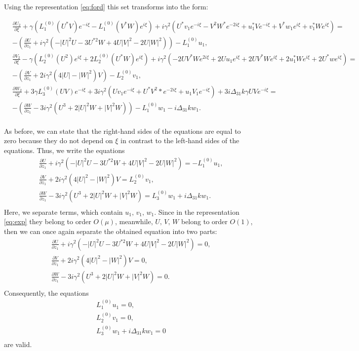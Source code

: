 \documentclass[a4paper, 12pt, onecolumn]{extarticle}
\begin{document}
Using the representation \eqref{eq:ford} this set transforms into the form:
\begin{small}
\[\begin{aligned}
&\frac{\partial U_2}{\partial \xi}+\gamma(L_1^{(0)}(U^*V)e^{-i\xi}-L_1^{(0)}(V^*W)e^{i\xi})+i\gamma^2(U^*v_1e^{-i\xi}-V^2W^*e^{-2i\xi}+u_1^*Ve^{-i\xi}+V^*w_1e^{i\xi}+v_1^*We^{i\xi})=\\
&-\left(\frac{\partial U}{\partial z_1}+i\gamma^2(-|U|^2U-3U^{*2}W+4U|V|^2-2U|W|^2)\right)-L_1^{(0)}u_1,\\
&\frac{\partial V_2}{\partial \xi}-\gamma(L_2^{(0)}(U^2)e^{i\xi}+2L_2^{(0)}(U^*W)e^{i\xi})+i\gamma^2(-2UV^*We^{2i\xi}+2Uu_1e^{i\xi}+2UV^*We^{i\xi}+2u_1^*We^{i\xi}+2U^*we^{i\xi})=\\
&-\left(\frac{\partial V}{\partial z_1}+2i\gamma^2(4|U|-|W|^2)V\right)-L_2^{(0)}v_1,\\
&\frac{\partial W_2}{\partial \xi}+3\gamma L_3^{(0)}(UV)e^{-i\xi}+3i\gamma^2(Uv_1e^{-i\xi}+U^*V^2*e^{-2i\xi}+u_1V_1e^{-i\xi})+3i\Delta_{31}k\gamma UVe^{-i\xi}=\\
&-\left(\frac{\partial W}{\partial z_1}-3i\gamma^2(U^3+2|U|^2W+|V|^2W)\right)-L_1^{(0)}w_1-i\Delta_{31}kw_1.\\
\end{aligned}\]
\end{small}
As before, we can state that the right-hand sides of the equations are equal to zero because they do not depend on \(\xi\) in contrast to the left-hand sides of the equations. Thus, we write the equations
\[\begin{aligned}
&\frac{\partial U}{\partial z_1}+i\gamma^2(-|U|^2U-3U^{*2}W+4U|V|^2-2U|W|^2)=-L_1^{(0)}u_1,\\
&\frac{\partial V}{\partial z_1}+2i\gamma^2(4|U|^2-|W|^2)V=L_2^{(0)}v_1,\\
&\frac{\partial W}{\partial z_1}-3i\gamma^2(U^3+2|U|^2W+|V|^2W)=L_3^{(0)}w_1+i\Delta_{31}kw_1.\\
\end{aligned}\]
Here, we separate terms, which contain \(u_1,\,v_1,\,w_1\). Since in the representation \eqref{eq:exp} they belong to order \(O(\mu)\), meanwhile, \(U,\,V,\,W\) belong to order \(O(1)\), then we can once again separate the obtained equation into two parts: 
\begin{equation}
\label{eq:mai}
\begin{aligned}
&\frac{\partial U}{\partial z_1}+i\gamma^2(-|U|^2U-3U^{*2}W+4U|V|^2-2U|W|^2)=0,\\
&\frac{\partial V}{\partial z_1}+2i\gamma^2(4|U|^2-|W|^2)V=0,\\
&\frac{\partial W}{\partial z_1}-3i\gamma^2(U^3+2|U|^2W+|V|^2W)=0.\\
\end{aligned}
\end{equation}
 Consequently, the equations
\begin{equation}
\begin{aligned}
&L_1^{(0)}u_1=0,\\
&L_2^{(0)}v_1=0,\\
&L_3^{(0)}w_1+i\Delta_{31}kw_1=0\\
\end{aligned}
\end{equation}
are valid.
\end{document}
